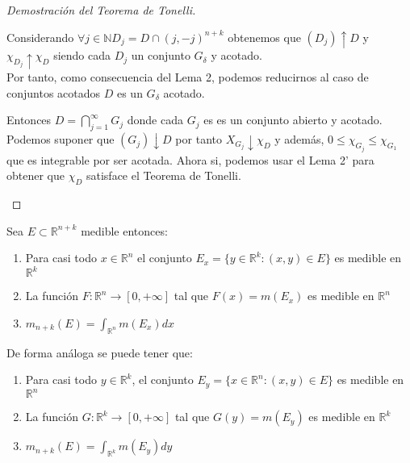 \begin{proof}[Demostración del Teorema de Tonelli]
\begin{enumerate}
        \begin{observación}
            Considerando $\forall j \in \mathbb{N} D_j = D \cap (j, -j)^{n+k}$ obtenemos que $(D_j)\uparrow D$ y $\chi_{D_j}\uparrow \chi_D$ siendo cada $D_j$ un conjunto $G_{\delta}$ y acotado. \\ Por tanto, como consecuencia del Lema 2, podemos reducirnos al caso de conjuntos acotados $D$ es un $G_{\delta}$ acotado.
        \end{observación}
        Entonces $D = \bigcap_{j = 1}^{\infty}G_j$ donde cada $G_j$ es es un conjunto abierto y acotado. Podemos suponer que $(G_j) \downarrow D$ por tanto $X_{G_j} \downarrow \chi_{D}$ y además, $0 \leq \chi_{G_j} \leq \chi_{G_{1}}$ que es integrable por ser acotada. Ahora si, podemos usar el Lema 2' para obtener que $\chi_{D}$ satisface el Teorema de Tonelli.
    \end{enumerate}
\end{proof}




\begin{corolario}
    Sea $E \subset \mathbb{R}^{n+k}$ medible entonces:
    \begin{enumerate}
        \item Para casi todo $x \in \mathbb{R}^n$ el conjunto $E_x = \{ y \in \mathbb{R}^k :
                  (x, y) \in E \}$ es medible en $\mathbb{R}^k$
        \item La función $F: \mathbb{R}^n \to [0, +\infty]$ tal que $F(x) = m(E_x)$ es
              medible en $\mathbb{R}^n$
        \item $m_{n+k}(E) = \int_{\mathbb{R}^n}m(E_x)dx$
    \end{enumerate}
    De forma análoga se puede tener que:
    \begin{enumerate}
        \item Para casi todo $y \in \mathbb{R}^k$, el conjunto $E_y = \{ x \in \mathbb{R}^n :
                  (x, y) \in E \}$ es medible en $\mathbb{R}^n$
        \item La función $G: \mathbb{R}^k \to [0, +\infty]$ tal que $G(y) = m(E_y)$ es
              medible en $\mathbb{R}^k$
        \item $m_{n+k}(E) = \int_{\mathbb{R}^k}m(E_y)dy$
    \end{enumerate}
\end{corolario}


